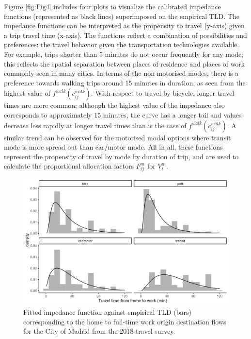 \documentclass[10pt,letterpaper]{article}
\begin{document}
Figure \ref{fig:Fig4} includes four plots to visualize the calibrated
impedance functions (represented as black lines) superimposed on the
empirical TLD. The impedance functions can be interpreted as the
propensity to travel (y-axis) given a trip travel time (x-axis). The
functions reflect a combination of possibilities and preferences: the
travel behavior given the transportation technologies available. For
example, trips shorter than 5 minutes do not occur frequently for any
mode; this reflects the spatial separation between places of residence
and places of work commonly seen in many cities. In terms of the
non-motorised modes, there is a preference towards walking trips around
15 minutes in duration, as seen from the highest value of
\(f^{walk}(c_{ij}^{walk})\). With respect to travel by bicycle, longer
travel times are more common; although the highest value of the
impedance also corresponds to approximately 15 minutes, the curve has a
longer tail and values decrease less rapidly at longer travel times than
is the case of \(f^{walk}(c_{ij}^{walk})\). A similar trend can be
observed for the motorised modal options where transit mode is more
spread out than car/motor mode. All in all, these functions represent
the propensity of travel by mode by duration of trip, and are used to
calculate the proportional allocation factors \(F_{ij}^m\) for
\(V_i^m\).

\begin{figure}

{\centering \includegraphics[width=0.85\linewidth]{images/Fig4} 

}

\caption{\label{fig:Fig4} Fitted impedance function against empirical TLD (bars) corresponding to the home to full-time work origin destination flows for the City of Madrid from the 2018 travel survey.}\label{fig:tlds-curves-m-plot}
\end{figure}
\end{document}
